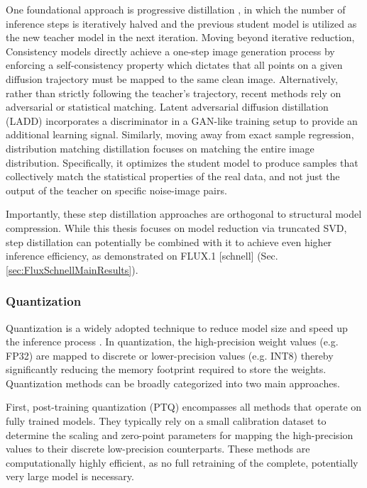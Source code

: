 One foundational approach is progressive distillation \cite{ProgressiveDistillation}, in which the number of inference steps is iteratively halved and the previous student model is utilized as the new teacher model in the next iteration. Moving beyond iterative reduction, Consistency models \cite{ConsistencyModel,LatentConsistencyModel} directly achieve a one-step image generation process by enforcing a self-consistency property which dictates that all points on a given diffusion trajectory must be mapped to the same clean image. 
Alternatively, rather than strictly following the teacher's trajectory, recent methods rely on adversarial or statistical matching. Latent adversarial diffusion distillation (\gls{LADD}) \cite{ADD,LADD} incorporates a discriminator in a GAN-like training setup to provide an additional learning signal. Similarly, moving away from exact sample regression,  distribution matching distillation \cite{DistillationMatching} focuses on matching the entire image distribution. Specifically, it optimizes the student model to produce samples that collectively match the statistical properties of the real data, and not just the output of the teacher on specific noise-image pairs.

Importantly, these step distillation approaches are orthogonal to structural model compression. While this thesis focuses on model reduction via truncated \gls{SVD}, step distillation can potentially be combined with it to achieve even higher inference efficiency, as demonstrated on
FLUX.1 [schnell] (Sec. \ref{sec:FluxSchnellMainResults}).

\subsubsection{Quantization}
Quantization is a widely adopted technique to reduce model size and speed up the inference process \cite{cai2020zeroq,jacob2018quantization,han2015deep}. In quantization, the high-precision weight values (e.g. FP32) are mapped to discrete or lower-precision values (e.g. INT8) thereby significantly reducing the memory footprint required to store the weights. Quantization methods can be broadly categorized into two main approaches.

First, post-training quantization (\gls{PTQ}) \cite{PTQD,jacob2018quantization, nagel2020up} encompasses all methods that operate on fully trained models. They typically rely on a small calibration dataset to determine the scaling and zero-point parameters for mapping the high-precision values to their discrete low-precision counterparts. These methods are computationally highly efficient, as no full retraining of the complete, potentially very large model is necessary. 

